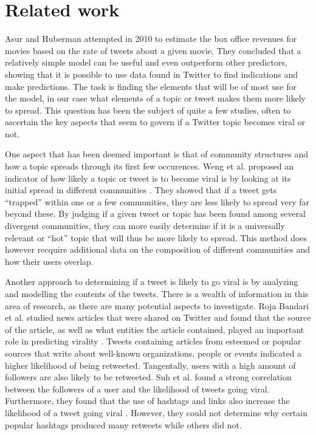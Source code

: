 \section{Related work}
\noindent Asur and Huberman attempted in 2010 to estimate the box office revenues for movies based on the rate of tweets about a given movie. 
They concluded that a relatively simple model can be useful and even outperform other predictors\cite{asur10}, showing that it is possible to use data found in Twitter to find indications and make predictions.
The task is finding the elements that will be of most use for the model, in our case what elements of a topic or tweet makes them more likely to spread.
This question has been the subject of quite a few studies, often to ascertain the key aspects that seem to govern if a Twitter topic becomes viral or not.

One aspect that has been deemed important is that of community structures and how a topic spreads through its first few occurences.
Weng et al. proposed an indicator of how likely a topic or tweet is to become viral is by looking at its initial spread in different communities \cite{weng14}. 
They showed that if a tweet gets ``trapped'' within one or a few communities, they are less likely to spread very far beyond these.
By judging if a given tweet or topic has been found among several divergent communities, they can more easily determine if it is a universally relevant or ``hot'' topic that will thus be more likely to spread.
This method does however recquire additional data on the composition of different communities and how their users overlap.

Another approach to determining if a tweet is likely to go viral is by analyzing and modelling the contents of the tweets.
There is a wealth of information in this area of research, as there are many potential aspects to investigate.
Roja Bandari et al. studied news articles that were shared on Twitter and found that the source of the article, as well as what entities the article contained, played an important role in predicting virality \cite{bandari12}.
Tweets containing articles from esteemed or popular sources that write about well-known organizations, people or events indicated a higher likelihood of being retweeted.
Tangentally, users with a high amount of followers are also likely to be retweeted. 
Suh et al. found a strong correlation between the followers of a user and the likelihood of tweets going viral. Furthermore, they found that the use of hashtags and links also increase the likelihood of a tweet going viral \cite{suh10}.
However, they could not determine why certain popular hashtags produced many retweets while others did not.

